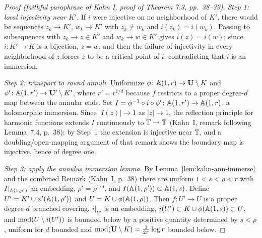 \documentclass[11pt,reqno]{amsart}
\theoremstyle{definition}
\theoremstyle{remark}
\begin{document}
\begin{proof}[Proof (faithful paraphrase of Kahn I, proof of Theorem 7.3, pp.~38--39)]
\emph{Step 1: local injectivity near \(K'\)}.  If \(i\)
were injective on no neighborhood of \(K'\), there would be sequences
\(z_k\to K'\), \(w_k\to K'\) with \(z_k\ne w_k\) and
\(i(z_k)=i(w_k)\).  Passing to subsequences with \(z_k\to z\in K'\)
and \(w_k\to w\in K'\) gives \(i(z)=i(w)\); since
\(i\colon K'\to K\) is a bijection, \(z=w\), and then the failure of
injectivity in every neighborhood of \(z\) forces \(z\) to be a
critical point of \(i\), contradicting that \(i\) is an immersion.

\emph{Step 2: transport to round annuli}.  Uniformize
\(\phi\colon\mathbb{A}(1,r)\to\mathbf{U}\setminus K\) and
\(\phi'\colon\mathbb{A}(1,r')\to\mathbf{U}'\setminus K'\), where \(r'=r^{1/d}\) because
\(f\) restricts to a proper degree-\(d\) map between the annular ends.
Set \(I=\phi^{-1}\circ i\circ\phi'\colon\mathbb{A}(1,r')\to\mathbb{A}(1,r)\), a
holomorphic immersion.  Since \(|I(z)|\to1\) as \(|z|\to1\), the
reflection principle for harmonic functions extends \(I\)
continuously to \(\mathbb{T}\to\mathbb{T}\) (Kahn~I, remark following Lemma~7.4, p.~38); by Step~1 the
extension is injective near \(\mathbb{T}\), and a doubling/open-mapping
argument of that remark shows the boundary map is injective, hence of
degree one.

\emph{Step 3: apply the annulus immersion lemma}.  By
Lemma~\ref{lem:kahn-ann-immerse} and the combined Remark
(Kahn~I, p.~38) there are uniform \(1<s<\rho<r\) with
\(I|_{\mathbb{A}(1,\rho')}\) an embedding, \(\rho'=\rho^{1/d}\), and
\(I(\mathbb{A}(1,\rho'))\subset\mathbb{A}(1,s)\).  Define
\(U'=K'\cup\phi'(\mathbb{A}(1,\rho'))\) and
\(U=K\cup\phi(\mathbb{A}(1,\rho))\).  Then \(f\colon U'\to U\) is a proper
degree-\(d\) branched covering, \(i|_{U'}\) is an embedding,
\(i(U')\subset K\cup\phi(\mathbb{A}(1,s))\subset U\), and
\(\operatorname{mod}(U\setminus i(U'))\) is bounded below by a positive quantity
determined by \(s<\rho\), uniform for \(d\) bounded and
\(\operatorname{mod}(\mathbf{U}\setminus K)=\tfrac{1}{2\pi}\log r\) bounded below.
\end{proof}
\end{document}
